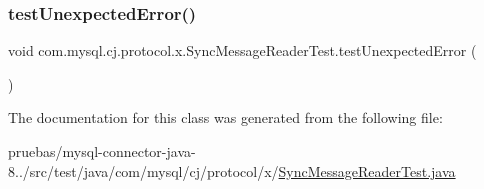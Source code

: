 \subsubsection{\texorpdfstring{test\+Unexpected\+Error()}{testUnexpectedError()}}
{\footnotesize\ttfamily void com.\+mysql.\+cj.\+protocol.\+x.\+Sync\+Message\+Reader\+Test.\+test\+Unexpected\+Error (\begin{DoxyParamCaption}{ }\end{DoxyParamCaption})}



The documentation for this class was generated from the following file\+:\begin{DoxyCompactItemize}
\item 
pruebas/mysql-\/connector-\/java-\/8../src/test/java/com/mysql/cj/protocol/x/\mbox{\hyperlink{_sync_message_reader_test_8java}{Sync\+Message\+Reader\+Test.\+java}}\end{DoxyCompactItemize}
